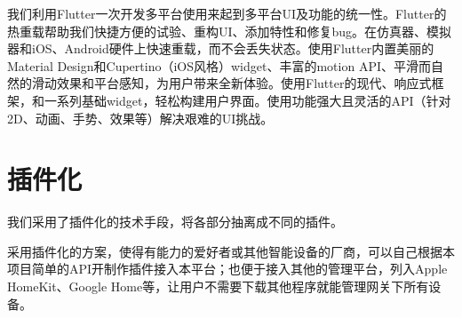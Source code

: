 我们利用Flutter一次开发多平台使用来起到多平台UI及功能的统一性。Flutter的热重载帮助我们快捷方便的试验、重构UI、添加特性和修复bug。在仿真器、模拟器和iOS、Android硬件上快速重载，而不会丢失状态。使用Flutter内置美丽的Material Design和Cupertino（iOS风格）widget、丰富的motion API、平滑而自然的滑动效果和平台感知，为用户带来全新体验。使用Flutter的现代、响应式框架，和一系列基础widget，轻松构建用户界面。使用功能强大且灵活的API（针对2D、动画、手势、效果等）解决艰难的UI挑战。\cite{quickdev}

\section{插件化}
我们采用了插件化的技术手段，将各部分抽离成不同的插件。

采用插件化的方案，使得有能力的爱好者或其他智能设备的厂商，可以自己根据本项目简单的API开制作插件接入本平台；也便于接入其他的管理平台，列入Apple HomeKit、Google Home等，让用户不需要下载其他程序就能管理网关下所有设备。